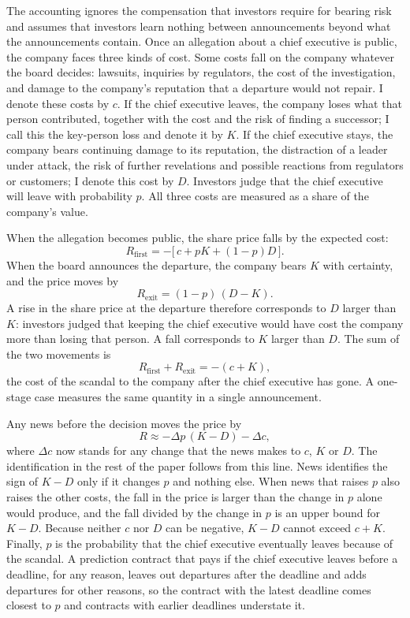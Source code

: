 \documentclass[11pt,a4paper]{article}
\begin{document}
The accounting ignores the compensation that investors require for bearing risk and assumes that investors learn nothing between announcements beyond what the announcements contain. Once an allegation about a chief executive is public, the company faces three kinds of cost. Some costs fall on the company whatever the board decides: lawsuits, inquiries by regulators, the cost of the investigation, and damage to the company's reputation that a departure would not repair. I denote these costs by $c$. If the chief executive leaves, the company loses what that person contributed, together with the cost and the risk of finding a successor; I call this the key-person loss and denote it by $K$. If the chief executive stays, the company bears continuing damage to its reputation, the distraction of a leader under attack, the risk of further revelations and possible reactions from regulators or customers; I denote this cost by $D$. Investors judge that the chief executive will leave with probability $p$. All three costs are measured as a share of the company's value.

When the allegation becomes public, the share price falls by the expected cost:
\begin{equation}
R_{\text{first}} = -\bigl[\,c + pK + (1-p)D\,\bigr].
\end{equation}
When the board announces the departure, the company bears $K$ with certainty, and the price moves by
\begin{equation}
R_{\text{exit}} = (1-p)\,(D - K).
\end{equation}
A rise in the share price at the departure therefore corresponds to $D$ larger than $K$: investors judged that keeping the chief executive would have cost the company more than losing that person. A fall corresponds to $K$ larger than $D$. The sum of the two movements is
\begin{equation}
R_{\text{first}} + R_{\text{exit}} = -(c + K),
\end{equation}
the cost of the scandal to the company after the chief executive has gone. A one-stage case measures the same quantity in a single announcement.

Any news before the decision moves the price by
\begin{equation}
R \approx -\Delta p\,(K - D) - \Delta c,
\end{equation}
where $\Delta c$ now stands for any change that the news makes to $c$, $K$ or $D$. The identification in the rest of the paper follows from this line. News identifies the sign of $K - D$ only if it changes $p$ and nothing else. When news that raises $p$ also raises the other costs, the fall in the price is larger than the change in $p$ alone would produce, and the fall divided by the change in $p$ is an upper bound for $K - D$. Because neither $c$ nor $D$ can be negative, $K - D$ cannot exceed $c + K$. Finally, $p$ is the probability that the chief executive eventually leaves because of the scandal. A prediction contract that pays if the chief executive leaves before a deadline, for any reason, leaves out departures after the deadline and adds departures for other reasons, so the contract with the latest deadline comes closest to $p$ and contracts with earlier deadlines understate it.
\end{document}
